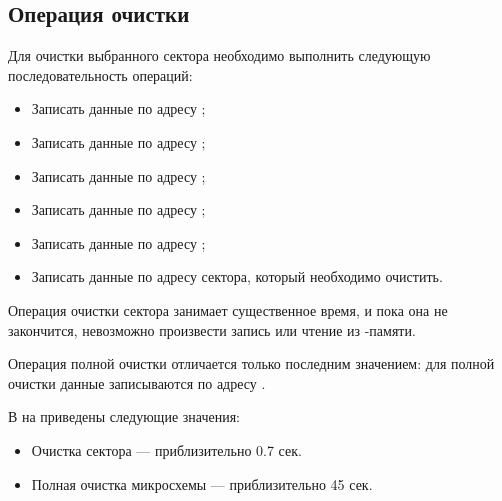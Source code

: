 \subsection{Операция очистки}
\par{Для очистки выбранного сектора необходимо выполнить следующую последовательность операций:
\begin{itemize}[noitemsep, label={}]
  \item Записать данные  по адресу ;
  \item Записать данные  по адресу ;
  \item Записать данные  по адресу ;
  \item Записать данные  по адресу ;
  \item Записать данные  по адресу ;
  \item Записать данные  по адресу сектора, который необходимо очистить.
\end{itemize}}
\par{Операция очистки сектора занимает существенное время, и пока она не закончится, невозможно произвести запись или чтение из -памяти.}
\par{Операция полной очистки отличается только последним значением: для полной очистки данные  записываются по адресу .}
\par{В  на  приведены следующие значения:
\begin{itemize}[noitemsep, label={}]
  \item Очистка сектора --- приблизительно 0.7 сек.
  \item Полная очистка микросхемы --- приблизительно 45 сек.
\end{itemize}}

